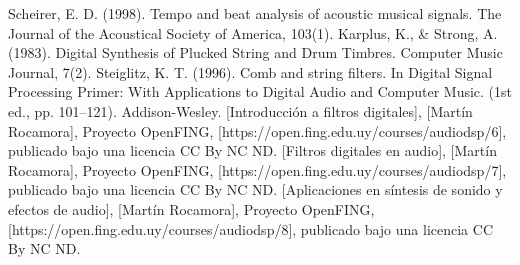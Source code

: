 \documentclass[a4paper]{article}
\begin{document}
\begin{table}[!h]
\centering
{}
\caption{Errores de la frecuencia fundamental en cada nota con y sin filtro pasa-todos}
\label{errores}
\end{table}





\newpage
\begin{thebibliography}{100} %
\addtolength{\leftmargin}{0.2in} %
\setlength{\itemindent}{-0.2in}
Scheirer, E. D. (1998). Tempo and beat analysis of acoustic musical signals. The Journal of the Acoustical Society of America, 103(1).
 Karplus, K., & Strong, A. (1983). Digital Synthesis of Plucked String and Drum Timbres. Computer Music Journal, 7(2).
 Steiglitz, K. T. (1996). Comb and string filters. In Digital Signal Processing Primer: With Applications to Digital Audio and Computer Music. (1st ed., pp. 101–121). Addison-Wesley.
 [Introducción a filtros digitales], [Martín Rocamora], Proyecto OpenFING, [https://open.fing.edu.uy/courses/audiodsp/6], publicado bajo una licencia CC By NC ND.
[Filtros digitales en audio], [Martín Rocamora], Proyecto OpenFING, [https://open.fing.edu.uy/courses/audiodsp/7], publicado bajo una licencia CC By NC ND.
[Aplicaciones en síntesis de sonido y efectos de audio], [Martín Rocamora], Proyecto OpenFING, [https://open.fing.edu.uy/courses/audiodsp/8], publicado bajo una licencia CC By NC ND.
\end{thebibliography}
\end{document}
